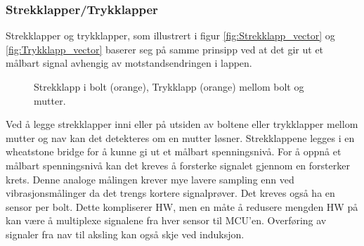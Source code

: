 \subsubsection{Strekklapper/Trykklapper}

Strekklapper og trykklapper, som illustrert i figur \ref{fig:Strekklapp_vector} og \ref{fig:Trykklapp_vector} baserer seg på samme prinsipp ved at det gir ut et målbart signal avhengig av
motstandsendringen i lappen. 
\begin{figure}[H] \centering
{}
\hfill
{}
\caption{\protect{\ref{fig:Strekklapp_vector}} Strekklapp i bolt (orange), \protect{\ref{fig:Trykklapp_vector}} Trykklapp (orange) mellom bolt og mutter.}
\end{figure}
Ved å legge strekklapper inni eller på utsiden av boltene eller
trykklapper mellom mutter og nav kan det detekteres om en mutter løsner. Strekklappene
legges i en wheatstone bridge \cite{wheatstone} for å kunne gi ut et målbart
spenningsnivå. For å oppnå et målbart spenningsnivå kan det kreves å
forsterke signalet gjennom en forsterker krets. Denne analoge målingen krever mye lavere sampling enn ved
vibrasjonsmålinger da det trengs kortere signalprøver.
Det kreves også ha en sensor per bolt. Dette kompliserer HW, men en måte å redusere
mengden HW på kan være å multiplexe signalene fra hver sensor til MCU'en. 
Overføring av signaler fra nav til aksling kan også skje ved induksjon. 

